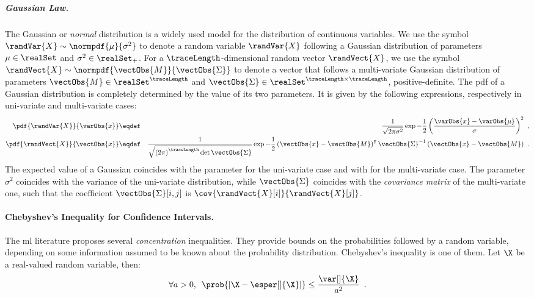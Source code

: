 \subparagraph{Gaussian Law.}
The Gaussian or \emph{normal} distribution is a widely used model for the distribution of continuous variables.
We use the symbol \(\randVar{X} \sim \normpdf{\mu}{\sigma^2}\) to denote a random variable \(\randVar{X}\) following a Gaussian distribution of parameters \(\mu \in \realSet\) and \(\sigma^2 \in \realSet_+\).
For a \(\traceLength\)-dimensional random vector \(\randVect{X}\), we use the symbol \(\randVect{X} \sim \normpdf{\vectObs{M}}{\vectObs{\Sigma}}\) to denote a vector that follows a multi-variate Gaussian distribution of parameters \(\vectObs{M} \in \realSet^\traceLength\) and \(\vectObs{\Sigma} \in \realSet^{\traceLength \times \traceLength}\), positive-definite.
The \gls{pdf} of a Gaussian distribution is completely determined by the value of its two parameters.
It is given by the following expressions, respectively in uni-variate and multi-variate cases:
\begin{eqnarray}
    \pdf{\randVar{X}}{\varObs{x}} & \eqdef & \frac{1}{\sqrt{2\pi\sigma^2}}\exp{-\frac{1}{2}\left(\frac{\varObs{x} - \varObs{\mu}}{\sigma}\right)^2} \enspace , \\
    \pdf{\randVect{X}}{\vectObs{x}} & \eqdef & \frac{1}{\sqrt{\left(2\pi\right)^\traceLength \det{\vectObs{\Sigma}}}}\exp{-\frac{1}{2} \left(\vectObs{x} - \vectObs{M}\right)^\intercal\vectObs{\Sigma}^{-1}\left(\vectObs{x} - \vectObs{M}\right)} \enspace .
    \label{eq:gauss_law}
\end{eqnarray}
The expected value of a Gaussian coincides with the parameter \varObs{\mu} for the uni-variate case and with  for the multi-variate case.
The parameter \(\sigma^2\) coincides with the variance of the uni-variate distribution, while \(\vectObs{\Sigma}\) coincides with the \emph{covariance matrix} of the multi-variate one, \ie{} such that the coefficient \(\vectObs{\Sigma}[i,j]\) is \(\cov{\randVect{X}[i]}{\randVect{X}[j]}\).


\paragraph{Chebyshev's Inequality for Confidence Intervals.}
The \gls{ml} literature proposes several \emph{concentration} inequalities.
They provide bounds on the probabilities followed by a random variable, depending on some information assumed to be known about the probability distribution.
Chebyshev's inequality is one of them.
Let \(\X\) be a real-valued random variable, then:
\begin{equation}
    \forall a > 0, \enspace \prob{\left|\X - \esper[]{\X} \right |} \leq \frac{\var[]{\X}}{a^2} \enspace .
\end{equation}

